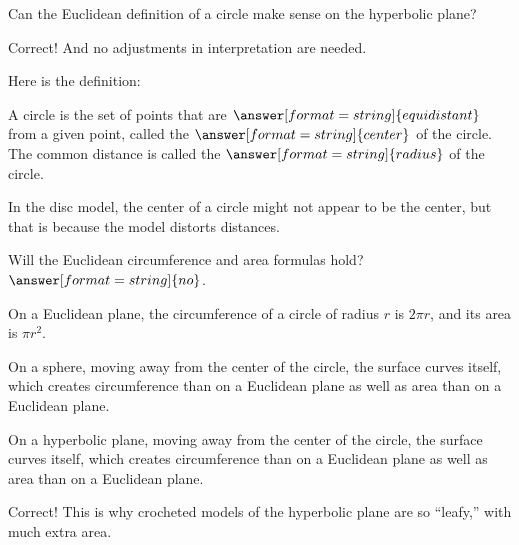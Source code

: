 \documentclass{ximera}
\begin{document}
\begin{problem}
Can the Euclidean definition of a circle make sense on the hyperbolic plane?  
\begin{multipleChoice}
\end{multipleChoice}
\begin{problem}
Correct! And no adjustments in interpretation are needed.

Here is the definition:  

A circle is the set of points that are $\answer[format=string]{equidistant}$ from a given point, called the $\answer[format=string]{center}$ of the circle.  The common distance is called the $\answer[format=string]{radius}$ of the circle.  

In the disc model, the center of a circle might not appear to be the center, but that is because the model distorts distances.  

\begin{problem}
Will the Euclidean circumference and area formulas hold?  
$\answer[format=string]{no}$. 
\begin{problem}
On a Euclidean plane, the circumference of a circle of radius $r$ is $2\pi r$, and its area is $\pi r^2$.  

On a sphere, moving away from the center of the circle, the surface curves  itself, which creates  circumference than on a Euclidean plane as well as  area than on a Euclidean plane.  

On a hyperbolic plane, moving away from the center of the circle, the surface curves  itself, which creates  circumference than on a Euclidean plane as well as  area than on a Euclidean plane.  
\begin{feedback}[correct]
Correct!  This is why crocheted models of the hyperbolic plane are so ``leafy,'' with much extra area.  
\end{feedback}

\end{problem}
\end{problem}
\end{problem}
\end{problem}
\end{document}
